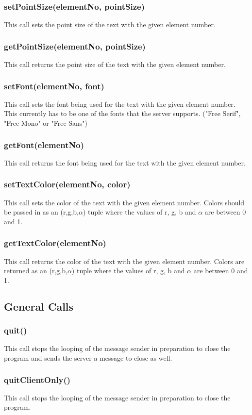 \documentclass{acm_proc_article-sp}
\begin{document}
\subsubsection{setPointSize(elementNo, pointSize)}
This call sets the point size of the text with the given element number.
\subsubsection{getPointSize(elementNo, pointSize)}
This call returns the point size of the text with the given element number.
\subsubsection{setFont(elementNo, font)}
This call sets the font being used for the text with the given element number. This currently has to be one of the fonts that the server supports. ("Free Serif", "Free Mono" or "Free Sans")
\subsubsection{getFont(elementNo)}
This call returns the font being used for the text with the given element number.
\subsubsection{setTextColor(elementNo, color)}
This call sets the color of the text with the given element number. Colors should be passed in as an (r,g,b,$\alpha$) tuple where the values of r, g, b and $\alpha$ are between 0 and 1.
\subsubsection{getTextColor(elementNo)}
This call returns the color of the text with the given element number. Colors are returned as an (r,g,b,$\alpha$) tuple where the values of r, g, b and $\alpha$ are between 0 and 1.
\subsection{General Calls}
\subsubsection{quit()}
This call stops the looping of the message sender in preparation to close the program and sends the server a message to close as well.
\subsubsection{quitClientOnly()}
This call stops the looping of the message sender in preparation to close the program.
\end{document}
